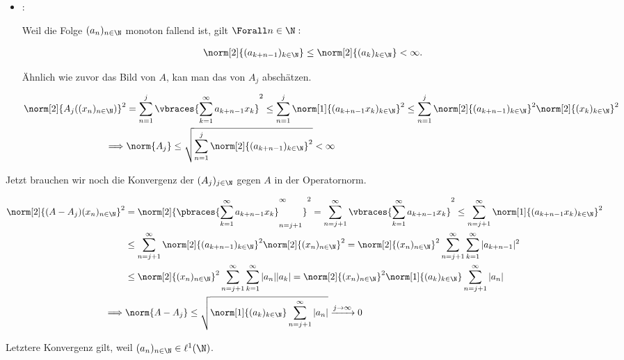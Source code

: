 \begin{solution}
\begin{itemize}
  \item
  :

  Weil die Folge $(a_n)_{n \in \N}$ monoton fallend ist, gilt $\Forall n \in \N:$

  \begin{align*}
    \norm[2]{(a_{k+n-1})_{k \in \N}}
    \leq
    \norm[2]{(a_k)_{k \in \N}} < \infty.
  \end{align*}

  Ähnlich wie zuvor das Bild von $A$, kan man das von $A_j$ abschätzen.

  \begin{align*}
    \norm[2]{A_j((x_n)_{n \in \N})}^2
    & =
    \sum_{n=1}^j
    \vbraces
    {
      \sum_{k=1}^\infty
      a_{k+n-1} x_k
    }^2
    \leq
    \sum_{n=1}^j
    \norm[1]{(a_{k+n-1} x_k)_{k \in \N}}^2
    \leq
    \sum_{n=1}^j
    \norm[2]{(a_{k+n-1})_{k \in \N}}^2
    \norm[2]{(x_k)_{k \in \N}}^2 \\
    \implies &
    \norm{A_j}
    \leq
    \sqrt
    {
      \sum_{n=1}^j
      \norm[2]{(a_{k+n-1})_{k \in \N}}^2
    } < \infty
  \end{align*}

\end{itemize}

Jetzt brauchen wir noch die Konvergenz der $(A_j)_{j \in \N}$ gegen $A$ in der Operatornorm.

\begin{align*}
  \norm[2]{(A - A_j)(x_n)_{n \in \N}}^2
  & =
  \norm[2]
  {
    \pbraces
    {
      \sum_{k=1}^\infty
      a_{k+n-1} x_k
    }_{n = j+1}^\infty
  }^2
  =
  \sum_{n = j+1}^\infty
  \vbraces
  {
    \sum_{k=1}^\infty
    a_{k+n-1} x_k
  }^2
  \leq
  \sum_{n = j+1}^\infty
  \norm[1]{(a_{k+n-1} x_k)_{k \in \N}}^2 \\
  & \leq
  \sum_{n = j+1}^\infty
  \norm[2]{(a_{k+n-1})_{k \in \N}}^2
  \norm[2]{(x_n)_{n \in \N}}^2
  =
  \norm[2]{(x_n)_{n \in \N}}^2
  \sum_{n = j+1}^\infty
  \sum_{k=1}^\infty
  |a_{k+n-1}|^2 \\
  & \leq
  \norm[2]{(x_n)_{n \in \N}}^2
  \sum_{n = j+1}^\infty
  \sum_{k=1}^\infty
  |a_n| |a_k|
  =
  \norm[2]{(x_n)_{n \in \N}}^2
  \norm[1]{(a_k)_{k \in \N}}
  \sum_{n = j+1}^\infty |a_n| \\
  \implies &
  \norm{A - A_j}
  \leq
  \sqrt
  {
    \norm[1]{(a_k)_{k \in \N}}
    \sum_{n = j+1}^\infty |a_n|
  }
  \xrightarrow{j \to \infty} 0
\end{align*}

Letztere Konvergenz gilt, weil $(a_n)_{n \in \N} \in \ell^1(\N)$. \\


\end{solution}
